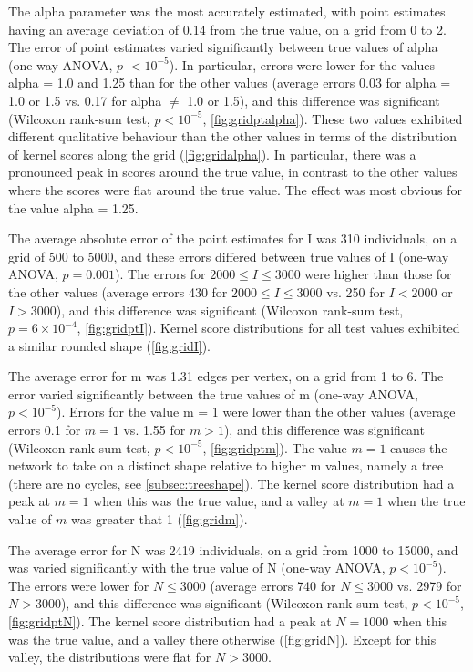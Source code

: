 The \gls{alpha} parameter was the most accurately estimated, with point
estimates having an average deviation of 
    0.14
from the true value, on a grid from 0 to 2. The error of point estimates varied
significantly between true values of \gls{alpha}
    (one-way \gls{ANOVA}, $p$ ${<}10^{-5}$). In
particular, errors were lower for the values \gls{alpha} = 1.0 and 1.25 than
for the other values
    (average errors 
    0.03
    for \gls{alpha} = 1.0 or 1.5 vs.
    0.17
    for \gls{alpha} $\neq$ 1.0 or 1.5),
and this difference was significant
    (Wilcoxon rank-sum test, $p {<}10^{-5}$,
     \cref{fig:gridptalpha}).
These two values exhibited different qualitative behaviour than the other
values in terms of the distribution of kernel scores along the grid
(\cref{fig:gridalpha}). In particular, there was a pronounced peak in scores
around the true value, in contrast to the other values where the scores were
flat around the true value. The effect was most obvious for the value
\gls{alpha} = 1.25.

The average absolute error of the point estimates for \gls{I} was 
    310 individuals,
on a grid of 500 to 5000, and these errors differed between true values of
\gls{I}
    (one-way \gls{ANOVA}, $p =0.001$).
The errors for $2000 \leq I \leq 3000$ were higher than those for the other
values
    (average errors
     430
     for $2000 \leq I \leq 3000$ vs.
     250
     for $I < 2000$ or $I > 3000$),
and this difference was significant
    (Wilcoxon rank-sum test, $p =6\!\times\!10^{-4}$,
     \cref{fig:gridptI}).
Kernel score distributions for all test values exhibited a similar rounded
shape (\cref{fig:gridI}). 

The average error for \gls{m} was
    1.31 edges per vertex,
on a grid from 1 to 6. The error varied significantly between the true values
of \gls{m} 
    (one-way \gls{ANOVA}, $p {<}10^{-5}$).
Errors for the value \gls{m} = 1 were lower than the other values
    (average errors
    0.1
    for $m = 1$ vs.
    1.55
    for $m > 1$),
and this difference was significant
    (Wilcoxon rank-sum test, $p {<}10^{-5}$,
     \cref{fig:gridptm}).
The value $m = 1$ causes the network to take on a distinct shape relative to
higher \gls{m} values, namely a tree (\ie there are no cycles, see
\cref{subsec:treeshape}). The kernel score distribution had a peak at $m = 1$
when this was the true value, and a valley at $m = 1$ when the true value of
$m$ was greater that 1 (\cref{fig:gridm}).

The average error for \gls{N} was 
    2419 individuals,
on a grid from 1000 to 15000, and was varied significantly with the true value
of \gls{N}
    (one-way \gls{ANOVA}, $p {<}10^{-5}$).
The errors were lower for $N \leq 3000$
    (average errors
     740
     for $N \leq 3000$ vs.
     2979
     for $N > 3000$),
and this difference was significant
    (Wilcoxon rank-sum test, $p {<}10^{-5}$,
     \cref{fig:gridptN}).
The kernel score distribution had a peak at $N = 1000$ when this was the true
value, and a valley there otherwise (\cref{fig:gridN}). Except for this valley,
the distributions were flat for $N > 3000$.

